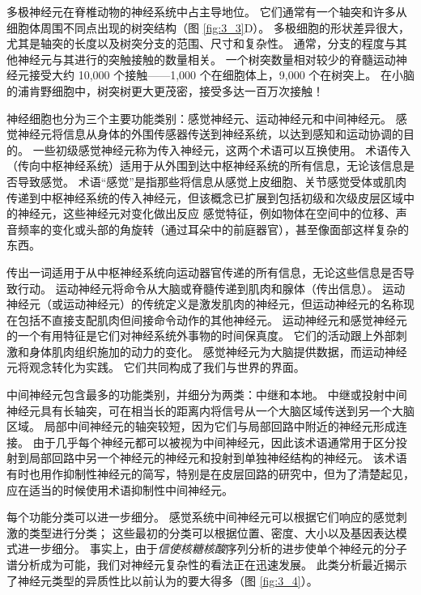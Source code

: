 多极神经元在脊椎动物的神经系统中占主导地位。 
它们通常有一个轴突和许多从细胞体周围不同点出现的树突结构（图 \ref{fig:3_3}D）。 
多极细胞的形状差异很大，尤其是轴突的长度以及树突分支的范围、尺寸和复杂性。 
通常，分支的程度与其他神经元与其进行的突触接触的数量相关。 
一个树突数量相对较少的脊髓运动神经元接受大约 10,000 个接触——1,000 个在细胞体上，9,000 个在树突上。 
在小脑的浦肯野细胞中，树突树更大更茂密，接受多达一百万次接触！


神经细胞也分为三个主要功能类别：感觉神经元、运动神经元和中间神经元。 
感觉神经元将信息从身体的外围传感器传送到神经系统，以达到感知和运动协调的目的。 
一些初级感觉神经元称为传入神经元，这两个术语可以互换使用。 
术语传入（传向中枢神经系统）适用于从外围到达中枢神经系统的所有信息，无论该信息是否导致感觉。 
术语“感觉”是指那些将信息从感觉上皮细胞、关节感觉受体或肌肉传递到中枢神经系统的传入神经元，但该概念已扩展到包括初级和次级皮层区域中的神经元，这些神经元对变化做出反应 感觉特征，例如物体在空间中的位移、声音频率的变化或头部的角旋转（通过耳朵中的前庭器官），甚至像面部这样复杂的东西。


传出一词适用于从中枢神经系统向运动器官传递的所有信息，无论这些信息是否导致行动。 
运动神经元将命令从大脑或脊髓传递到肌肉和腺体（传出信息）。 
运动神经元（或运动神经元）的传统定义是激发肌肉的神经元，但运动神经元的名称现在包括不直接支配肌肉但间接命令动作的其他神经元。 
运动神经元和感觉神经元的一个有用特征是它们对神经系统外事物的时间保真度。 
它们的活动跟上外部刺激和身体肌肉组织施加的动力的变化。 
感觉神经元为大脑提供数据，而运动神经元将观念转化为实践。 
它们共同构成了我们与世界的界面。


中间神经元包含最多的功能类别，并细分为两类：中继和本地。 
中继或投射中间神经元具有长轴突，可在相当长的距离内将信号从一个大脑区域传送到另一个大脑区域。 
局部中间神经元的轴突较短，因为它们与局部回路中附近的神经元形成连接。 
由于几乎每个神经元都可以被视为中间神经元，因此该术语通常用于区分投射到局部回路中另一个神经元的神经元和投射到单独神经结构的神经元。 
该术语有时也用作抑制性神经元的简写，特别是在皮层回路的研究中，但为了清楚起见，应在适当的时候使用术语抑制性中间神经元。


每个功能分类可以进一步细分。 
感觉系统中间神经元可以根据它们响应的感觉刺激的类型进行分类； 
这些最初的分类可以根据位置、密度、大小以及基因表达模式进一步细分。 
事实上，由于\textit{信使核糖核酸}序列分析的进步使单个神经元的分子谱分析成为可能，我们对神经元复杂性的看法正在迅速发展。 
此类分析最近揭示了神经元类型的异质性比以前认为的要大得多（图 \ref{fig:3_4}）。

